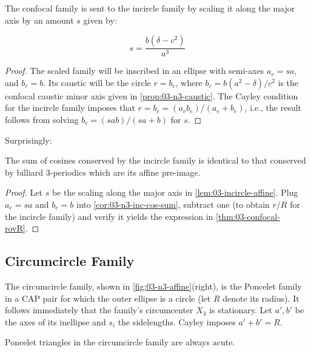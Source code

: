 \begin{lemma}
The confocal family is sent to the incircle family by scaling it along the major axis by an amount $s$ given by:

\[ s=\frac{b (\delta-c^2)}{a^3} \]

\label{lem:03-incircle-affine}
\end{lemma}

\begin{proof}
The scaled family will be inscribed in an ellipse with semi-axes $a_e = s a$, and $b_e =b$. Its caustic will be the circle $r=b_c$, where $b_c={b\left({a}^{2}-\delta\right)}/{c^2}$ is the confocal caustic minor axis given in \cref{prop:03-n3-caustic}. The Cayley condition for the incircle family imposes that $r=b_c=(a_e b_e)/(a_e + b_e)$, i.e., the result follows from solving $b_c = (s a b)/(s a + b)$ for $s$.

\end{proof}

\noindent Surprisingly:

\begin{proposition}
The sum of cosines conserved by the incircle family is identical to that conserved by billiard 3-periodics which are its affine pre-image.
\label{prop:03-incircle-same-sum-cos}
\end{proposition}

\begin{proof}
Let $s$ be the scaling along the major axis in \cref{lem:03-incircle-affine}. Plug $a_e=s a$ and $b_e=b$ into  \cref{cor:03-n3-inc-cos-sum}, subtract one (to obtain $r/R$ for the incircle family) and verify it yields the expression in \cref{thm:03-confocal-rovR}.
\end{proof}

\subsection{Circumcircle Family}

The circumcircle family, shown in \cref{fig:03-n3-affine}(right), is the Poncelet family in a CAP pair for which the outer ellipse is a circle (let $R$ denote its radius). It follows immediately that the family's circumcenter $X_3$ is stationary. Let $a',b'$ be the axes of its inellipse and $s_i$ the sidelengths. Cayley imposes $a'+b'=R$.

\begin{lemma}
Poncelet triangles in the circumcircle family are always acute.
\label{lem:03-circum-acute}
\end{lemma}

